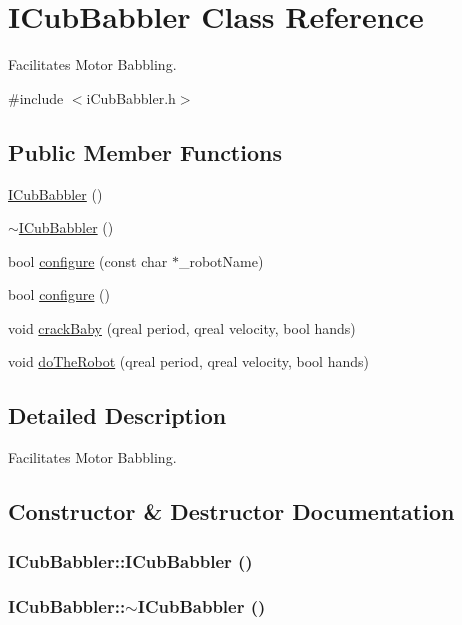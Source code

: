 \hypertarget{class_i_cub_babbler}{
\section{ICubBabbler Class Reference}
\label{class_i_cub_babbler}
}


Facilitates Motor Babbling.  


{\ttfamily \#include $<$iCubBabbler.h$>$}\subsection*{Public Member Functions}
\begin{DoxyCompactItemize}
\item 
\hyperlink{class_i_cub_babbler_a1100623ef8b298c436f2c5059541128e}{ICubBabbler} ()
\item 
\hyperlink{class_i_cub_babbler_aa48d49a9706055cd5323937fdb5a0229}{$\sim$ICubBabbler} ()
\item 
bool \hyperlink{class_i_cub_babbler_affe4b96670efff3357f67aa26def4481}{configure} (const char $\ast$\_\-robotName)
\item 
bool \hyperlink{class_i_cub_babbler_a90c2ae6f6f5a8032cc7a49e1966b2af6}{configure} ()
\item 
void \hyperlink{class_i_cub_babbler_a5913a116c61504e6705d1c5de27c5324}{crackBaby} (qreal period, qreal velocity, bool hands)
\item 
void \hyperlink{class_i_cub_babbler_a9ab1247bc5dba75476146438fe70d207}{doTheRobot} (qreal period, qreal velocity, bool hands)
\end{DoxyCompactItemize}


\subsection{Detailed Description}
Facilitates Motor Babbling. 

\subsection{Constructor \& Destructor Documentation}
\hypertarget{class_i_cub_babbler_a1100623ef8b298c436f2c5059541128e}{
\subsubsection[{ICubBabbler}]{\setlength{\rightskip}{0pt plus 5cm}ICubBabbler::ICubBabbler ()}}
\label{class_i_cub_babbler_a1100623ef8b298c436f2c5059541128e}
\hypertarget{class_i_cub_babbler_aa48d49a9706055cd5323937fdb5a0229}{
\subsubsection[{$\sim$ICubBabbler}]{\setlength{\rightskip}{0pt plus 5cm}ICubBabbler::$\sim$ICubBabbler ()}}
\label{class_i_cub_babbler_aa48d49a9706055cd5323937fdb5a0229}


